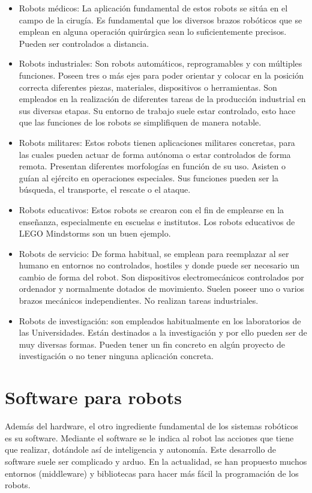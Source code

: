 \begin{itemize}
		\item Robots médicos: La aplicación fundamental de estos robots se sitúa en el campo de la cirugía. Es fundamental que los diversos brazos robóticos que se emplean en alguna operación quirúrgica sean lo suficientemente precisos. Pueden ser controlados a distancia. 
		
		\item Robots industriales: Son robots automáticos, reprogramables y con múltiples funciones. Poseen tres o más ejes para poder orientar y colocar en la posición correcta diferentes piezas, materiales, dispositivos o herramientas. Son empleados en la realización de diferentes tareas de la producción industrial en sus diversas etapas. Su entorno de trabajo suele estar controlado, esto hace que las funciones de los robots se simplifiquen de manera notable. 
		
		\item Robots militares: Estos robots tienen aplicaciones militares concretas, para las cuales pueden actuar de forma autónoma o estar controlados de forma remota. Presentan diferentes morfologías en función de su uso. Asisten o guían al ejército en operaciones especiales. Sus funciones pueden ser la búsqueda, el transporte, el rescate o el ataque.
		
		\item Robots educativos: Estos robots se crearon con el fin de emplearse en la enseñanza, especialmente en escuelas e institutos. Los robots educativos de LEGO Mindstorms son un buen ejemplo.
		
		\item Robots de servicio: De forma habitual, se emplean para reemplazar al ser humano en entornos no controlados, hostiles y donde puede ser necesario un cambio de forma del robot. Son dispositivos electromecánicos controlados por ordenador y normalmente dotados de movimiento. Suelen poseer uno o varios brazos mecánicos independientes. No realizan tareas industriales.
		
		\item Robots de investigación: son empleados habitualmente en los laboratorios de las Universidades. Están destinados a la investigación y por ello pueden ser de muy diversas formas. Pueden tener un fin concreto en algún proyecto de investigación o no tener ninguna aplicación concreta.
	\end{itemize}


\section{Software para robots}
Además del hardware, el otro ingrediente fundamental de los sistemas robóticos es su software. Mediante el software se le indica al robot las acciones que tiene que realizar, dotándole así de inteligencia y autonomía. Este desarrollo de software suele ser complicado y arduo. En la actualidad, se han propuesto muchos entornos (middleware) y bibliotecas para hacer más fácil la programación de los robots. 

